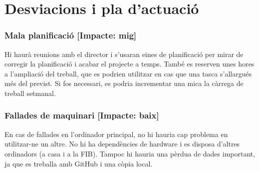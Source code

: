 \section{Desviacions i pla d'actuació}
	\subsubsection{Mala planificació [Impacte: mig]}
		Hi haurà reunions amb el director i s'usaran eines de planificació per mirar de corregir la planificació i acabar el projecte a temps. També es reserven unes hores a l'ampliació del treball,
		que es podrien utilitzar en cas que una tasca s'allargués més del previst. Si fos necessari, es podria incrementar una mica la càrrega de treball setmanal.
	\subsubsection{Fallades de maquinari [Impacte: baix]}
		En cas de fallades en l'ordinador principal, no hi hauria cap problema en utilitzar-ne un altre. No hi ha dependències de hardware i es disposa d'altres ordinadors (a casa i a la FIB).
		Tampoc hi hauria una pèrdua de dades important, ja que es treballa amb GitHub i una còpia local.
